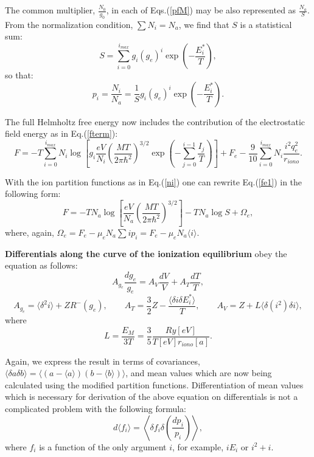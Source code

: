 The common multiplier, $\frac{N_0}{g_0}$, in each of Eqs.(\ref{pfM}) may be also represented as $\frac{N_a}{S}$.
From the normalization condition, $\sum N_i = N_a$, we find that $S$ is a statistical sum:
\begin{equation}
S=\sum_{i=0}^{i_{max}} g_i (g_e)^i \exp\left(-\frac{E_i^*}T\right),
\end{equation}
so that:
\begin{equation}\label{ni}
p_i = \frac{N_i}{N_a} = \frac{1}S g_i (g_e)^i \exp \left( -\frac{E_i^*}T \right).
\end{equation}

The full Helmholtz free energy now includes the contribution of the electrostatic field energy as in Eq.(\ref{fterm}):
\begin{equation}\label{fe1}
F=-T
\sum_{i=0}^{i_{max}}{
N_i\log\left[g_i
  \frac{eV}{N_i}\left(\frac{MT}{2\pi \hbar^2}\right)^{3/2}\exp \left(-\sum_{j=0}^{i-1}\frac{I_j}T \right)\right]}+F_e
  -\frac{9}{10} \sum_{i=0}^{i_{max}} N_i \frac{i^2 q_e^2}{r_{iono}}.
\end{equation}  

With the ion partition functions as in Eq.(\ref{ni}) one can rewrite Eq.(\ref{fe1}) in the following form:
\begin{equation}\label{ffullm}
F = -TN_a\log\left[\frac{eV}{N_a}\left(\frac{MT}{2\pi \hbar^2}\right)^{3/2}\right]-TN_a\log S + \Omega_e, 
\end{equation}
where, again, $\Omega_e = F_e - \mu_e N_a \sum i p_i = F_e - \mu_e N_a \langle i \rangle $.

{\bf Differentials along the curve of the ionization equilibrium} obey the equation as follows:
\begin{equation}\label{diffstruct}
A_{g_e} \frac{dg_e}{g_e} = A_V \frac{dV}{V} + A_T \frac{dT}{T},
\end{equation}
\begin{equation}
A_{g_e} = \langle \delta^2 i \rangle + ZR^-(g_e), \qquad
A_T     = \frac32 Z - \frac{\langle \delta i \delta E^*_i \rangle}{T}, \qquad
A_V     = Z + L \langle \delta(i^2) \delta i \rangle,
\end{equation}
where 
\begin{equation}
L   = \frac{E_M}{3T} = \frac35 \frac{Ry[eV]}{T[eV] r_{iono}[a]}.
\end{equation}


Again, we express the result in terms of covariances,
$\langle \delta a \delta b \rangle = \langle (a - \langle a \rangle) (b - \langle b \rangle) \rangle$,
and mean values which are now being calculated
using the modified partition functions.
Differentiation of mean values which is necessary for derivation of the above equation on
differentials is not a complicated problem with the following formula:
\begin{equation}
d \langle f_i \rangle = \left\langle \delta f_i \delta\left( \frac{dp_i}{p_i} \right) \right\rangle,
\end{equation}
where $f_i$ is a function of the only argument $i$, for example, $iE_i$ or $i^2+i$.

